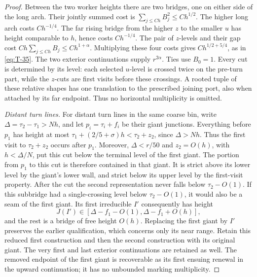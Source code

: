 \begin{proof}
Between the two worker heights there are two bridges, one on either
side of the long arch. Their jointly summed cost is
\(\sum_{j\le Ch}B_j^2\le Ch^{1/2}\). The higher long arch costs
\(Ch^{-1/4}\). The far rising bridge from the higher \(z\) to the smaller
\(u\) has height comparable to \(h\), hence costs \(Ch^{-1/4}\).
The pair of \(z\)-levels and their gap cost
\(Ch\sum_{j\le Ch}B_j\le Ch^{1+\alpha}\). Multiplying these four costs
gives \(Ch^{1/2+5/4}\), as in \eqref{eq:T-35}. The two exterior
continuations supply \(r^{2\alpha}\). Ties use \(B_0=1\).
Every cut is determined by its level: each selected \(u\)-level is
crossed twice on the pre-turn part, while the \(z\)-cuts are first
visits before these crossings. A rooted tuple of these relative shapes
has one translation to the prescribed joining port, also when attached
by its far endpoint. Thus no horizontal multiplicity is omitted.

\smallskip\noindent\emph{Distant turn lines.}
For distant turn lines in the same coarse bin, write
\(\Delta=\tau_2-\tau_1>Nh\), and let \(p_i=\tau_i+f_i\) be their giant junctions.
Everything before \(p_1\) has height at most
\(\tau_1+(2/5+\sigma)h<\tau_2+z_2\), since \(\Delta>Nh\).
Thus the first visit to \(\tau_2+z_2\) occurs after \(p_1\).
Moreover, \(\Delta<r/50\) and \(z_2=O(h)\), with \(h<\Delta/N\),
put this cut below the terminal level of the first giant. The portion
from \(p_1\) to this cut is therefore contained in that giant. It is
strict above its lower level by the giant's lower wall, and strict
below its upper level by the first-visit property. After the cut the
second representation never falls below \(\tau_2-O(1)\). If this subbridge had a
single-crossing level below \(\tau_2-O(1)\), it would also be a seam of the
first giant. Its first irreducible \(I'\) consequently has height
\[
 J(I')\in[\Delta-f_1-O(1),\Delta-f_1+O(h)],
\]
and the rest is a bridge of free height \(O(h)\). Replacing the first
giant by \(I'\) preserves the earlier qualification, which concerns
only its near range. Retain this reduced first construction and then
the second construction with its original giant. The very first and
last exterior continuations are retained as well. The removed endpoint
of the first giant is recoverable as its first ensuing renewal in the
upward continuation; it has no unbounded marking multiplicity.


\end{proof}
